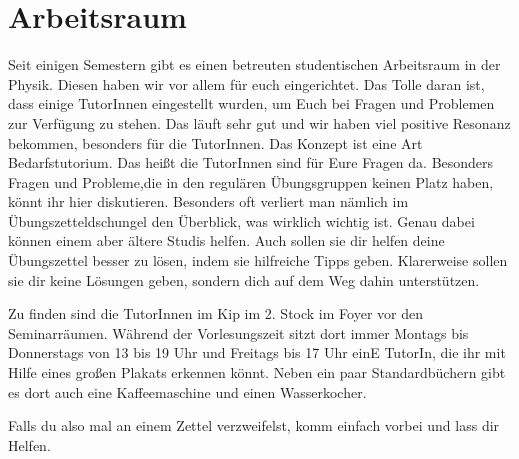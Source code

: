 \section{Arbeitsraum}
\label{sec:arbeitsraum}
Seit einigen Semestern gibt es einen betreuten studentischen Arbeitsraum in der Physik. Diesen haben wir vor allem für euch eingerichtet. Das Tolle daran ist, dass einige TutorInnen eingestellt wurden, um Euch bei Fragen und Problemen zur Verfügung zu stehen. Das läuft sehr gut und wir haben viel positive Resonanz bekommen, besonders für die TutorInnen. Das Konzept ist eine Art Bedarfstutorium. Das heißt die TutorInnen sind für Eure Fragen da. Besonders Fragen und Probleme,die in den regulären Übungsgruppen keinen Platz haben, könnt ihr hier diskutieren. Besonders oft verliert man nämlich im Übungszetteldschungel den Überblick, was wirklich wichtig ist. Genau dabei können einem aber ältere Studis helfen. Auch sollen sie dir helfen deine Übungszettel besser zu lösen, indem sie hilfreiche Tipps geben. Klarerweise sollen sie dir keine Lösungen geben, sondern dich auf dem Weg dahin unterstützen.

Zu finden sind die TutorInnen im Kip im 2. Stock im Foyer vor den Seminarräumen. Während der Vorlesungszeit sitzt dort immer Montags bis Donnerstags von 13 bis 19 Uhr und Freitags bis 17 Uhr einE TutorIn, die ihr mit Hilfe eines großen Plakats erkennen könnt. Neben ein paar Standardbüchern gibt es dort auch eine Kaffeemaschine und einen Wasserkocher.

Falls du also mal an einem Zettel verzweifelst, komm einfach vorbei und lass dir Helfen.
